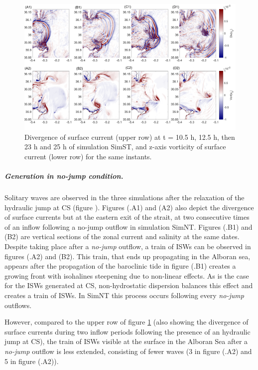 \begin{figure}[!h]
 \centering
\includegraphics[width=\linewidth]{./GBR3D/FigTourbVE2.png}
 \caption {Divergence of surface current (upper row) at t = 10.5 h, 12.5 h, then 23 h and 25 h of simulation SimST, and z-axis vorticity of surface current (lower row) for the same instants.}
 \label{FigeddGBR3D}
\end{figure}

\subparagraph{Generation in \textit{no-jump} condition.}
Solitary waves are observed in the three simulations after the relaxation of the hydraulic jump at CS (figure ). Figures (.A1) and (A2) also depict the divergence of surface currents but at the eastern exit of the strait, at two consecutive times of an inflow following a no-jump outflow in simulation SimNT. Figures (.B1) and (B2) are vertical sections of the zonal current and salinity at the same dates. Despite taking place after a \textit{no-jump} outflow, a train of ISWs can be observed in figures (.A2) and (B2). This train, that ends up propagating in the Alboran sea, appears after the propagation of the baroclinic tide in figure (.B1) creates a growing front with isohalines steepening due to non-linear effects. As is the case for the ISWs generated at CS, non-hydrostatic dispersion balances this effect and creates a train of ISWs. In SimNT this process occurs following every \textit{no-jump} outflows.

However, compared to the upper row of figure \ref{FigeddGBR3D} (also showing the divergence of surface currents during two inflow periods following the presence of an hydraulic jump at CS), the train of ISWs visible at the surface in the Alboran Sea after a \textit{no-jump} outflow is less extended, consisting of fewer waves (3 in figure (.A2) and 5 in figure (.A2)).

